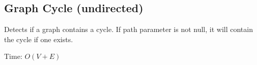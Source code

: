 \subsection{Graph Cycle (undirected)}
Detects if a graph contains a cycle. If path parameter is not null, it will contain the cycle if one exists.

Time: $O(V + E)$

